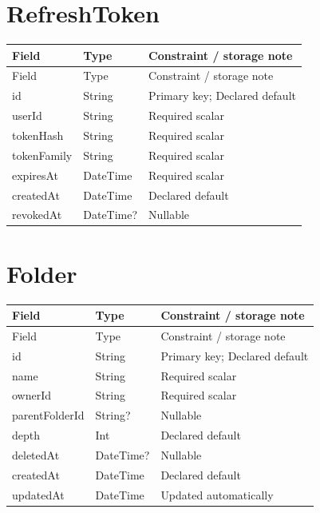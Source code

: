 \section{RefreshToken}
\begin{longtable}{p{.31\linewidth}p{.23\linewidth}p{.36\linewidth}}\toprule Field&Type&Constraint / storage note\\\midrule\endfirsthead\toprule Field&Type&Constraint / storage note\\\midrule\endhead
id&String&Primary key; Declared default\\
userId&String&Required scalar\\
tokenHash&String&Required scalar\\
tokenFamily&String&Required scalar\\
expiresAt&DateTime&Required scalar\\
createdAt&DateTime&Declared default\\
revokedAt&DateTime?&Nullable\\
\bottomrule\end{longtable}

\section{Folder}
\begin{longtable}{p{.31\linewidth}p{.23\linewidth}p{.36\linewidth}}\toprule Field&Type&Constraint / storage note\\\midrule\endfirsthead\toprule Field&Type&Constraint / storage note\\\midrule\endhead
id&String&Primary key; Declared default\\
name&String&Required scalar\\
ownerId&String&Required scalar\\
parentFolderId&String?&Nullable\\
depth&Int&Declared default\\
deletedAt&DateTime?&Nullable\\
createdAt&DateTime&Declared default\\
updatedAt&DateTime&Updated automatically\\
\bottomrule\end{longtable}


